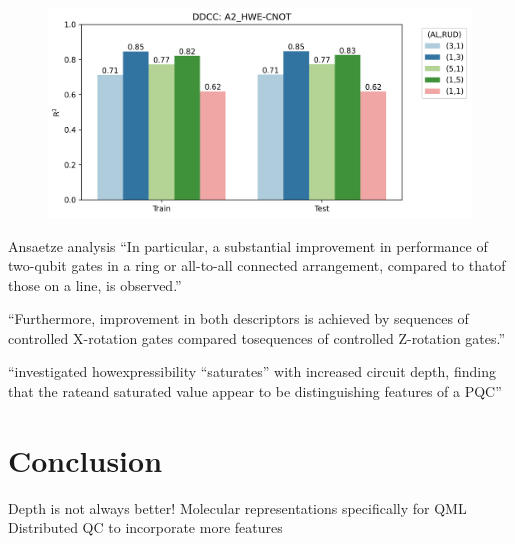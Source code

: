 \documentclass[journal=jacsat,manuscript=article]{achemso}
\begin{document}
\begin{figure}[H]
	\centering
	\includegraphics[width=\linewidth]{../images/DDCC/DDCC_RUDAL}
	\caption{}
	\label{fig:ddccrudal}
\end{figure}




Ansaetze analysis \cite{sim_expressibility_2019}
``In particular, a substantial improvement in performance of two-qubit gates in a ring or all-to-all connected arrangement, compared to thatof those on a line, is observed.''

``Furthermore, improvement in both descriptors is achieved by sequences of controlled X-rotation gates compared tosequences of controlled Z-rotation gates.''

``investigated howexpressibility “saturates” with increased circuit depth, finding that the rateand saturated value appear to be distinguishing features of a PQC''



\section{Conclusion}
Depth is not always better!
Molecular representations specifically for QML
Distributed QC to incorporate more features


\end{document}
